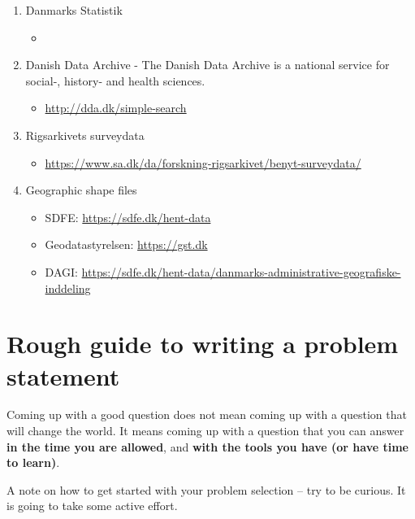 \documentclass[
]{book}
\providecommand{\tightlist}{%
  \setlength{\itemsep}{0pt}\setlength{\parskip}{0pt}}
\begin{document}
\begin{enumerate}
\def\labelenumi{\arabic{enumi}.}
\tightlist
\item
  Danmarks Statistik

  \begin{itemize}
  \tightlist
  \item
  \end{itemize}
\item
  Danish Data Archive - The Danish Data Archive is a national service for social-, history- and health sciences.

  \begin{itemize}
  \tightlist
  \item
    \url{http://dda.dk/simple-search}
  \end{itemize}
\item
  Rigsarkivets surveydata

  \begin{itemize}
  \tightlist
  \item
    \url{https://www.sa.dk/da/forskning-rigsarkivet/benyt-surveydata/}
  \end{itemize}
\item
  Geographic shape files

  \begin{itemize}
  \tightlist
  \item
    SDFE: \url{https://sdfe.dk/hent-data}
  \item
    Geodatastyrelsen: \url{https://gst.dk}
  \item
    DAGI: \url{https://sdfe.dk/hent-data/danmarks-administrative-geografiske-inddeling}
  \end{itemize}
\end{enumerate}

\hypertarget{rough-guide-to-writing-a-problem-statement}{%
\chapter{Rough guide to writing a problem statement}\label{rough-guide-to-writing-a-problem-statement}}

Coming up with a good question does not mean coming up with a question
that will change the world. It means coming up with a question that you
can answer \textbf{in the time you are allowed}, and \textbf{with the tools you
have (or have time to learn)}.

A note on how to get started with your problem selection -- try to be
curious. It is going to take some active effort.
\end{document}
